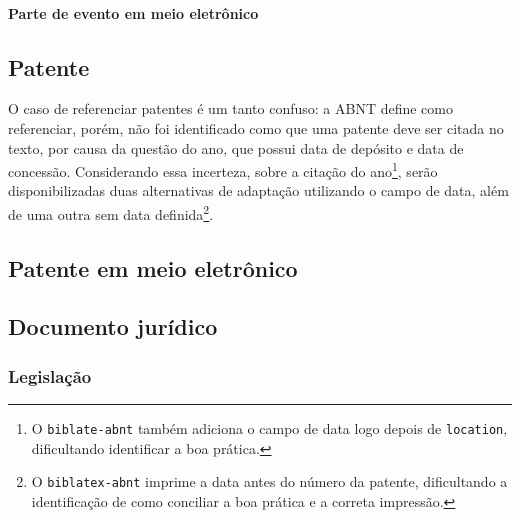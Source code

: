 \paragraph{Parte de evento em meio eletrônico} %
  \exEssencial

  \exOutros

\subsection{Patente} %
O caso de referenciar patentes é um tanto confuso: a ABNT define como referenciar, porém, não foi identificado como que uma patente deve ser citada no texto, por causa da questão do ano, que possui data de depósito e data de concessão. Considerando essa incerteza, sobre a citação do ano\footnote{O \texttt{biblate-abnt} também adiciona o campo de data logo depois de \texttt{location}, dificultando identificar a boa prática.}, serão disponibilizadas duas alternativas de adaptação utilizando o campo de data, além de uma outra sem data definida\footnote{O \texttt{biblatex-abnt} imprime a data antes do número da patente, dificultando a identificação de como conciliar a boa prática e a correta impressão.}.
  \exEssencial

  \exOutros

\subsection{Patente em meio eletrônico} %
  \exEssencial

\subsection{Documento jurídico} %

\subsubsection{Legislação} %
  \exEssencial

